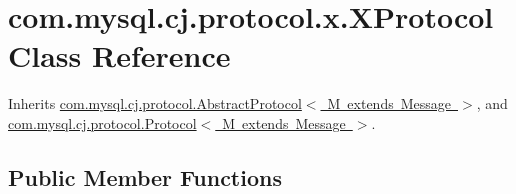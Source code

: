 \hypertarget{classcom_1_1mysql_1_1cj_1_1protocol_1_1x_1_1_x_protocol}{}\section{com.\+mysql.\+cj.\+protocol.\+x.\+X\+Protocol Class Reference}
\label{classcom_1_1mysql_1_1cj_1_1protocol_1_1x_1_1_x_protocol}


Inherits \mbox{\hyperlink{classcom_1_1mysql_1_1cj_1_1protocol_1_1_abstract_protocol}{com.\+mysql.\+cj.\+protocol.\+Abstract\+Protocol$<$ M extends Message $>$}}, and \mbox{\hyperlink{interfacecom_1_1mysql_1_1cj_1_1protocol_1_1_protocol}{com.\+mysql.\+cj.\+protocol.\+Protocol$<$ M extends Message $>$}}.

\subsection*{Public Member Functions}

